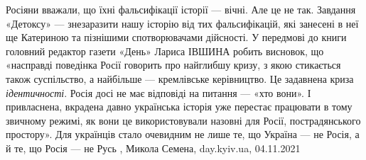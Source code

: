 Росіяни вважали, що їхні фальсифікації історії — вічні. Але це не так. Завдання
«Детоксу» — знезаразити нашу історію від тих фальсифікацій, які занесені в неї
ще Катериною та пізнішими спотворювачами дійсності. У передмові до книги
головний редактор газети «День» Лариса ІВШИНА робить висновок, що «насправді
поведінка Росії говорить про найглибшу кризу, з якою стикається також
суспільство, а найбільше — кремлівське керівництво. Це задавнена криза
\emph{ідентичності}. Росія досі не має відповіді на питання — «хто вони». І
привласнена, вкрадена давно українська історія уже перестає працювати в тому
звичному режимі, як вони це використовували назовні для Росії, пострадянського
простору». Для українців стало очевидним не лише те, що Україна — не Росія, а й
те, що Росія — не Русь
, Микола Семена, day.kyiv.ua, 04.11.2021
